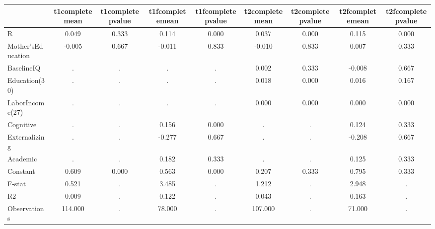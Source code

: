 \begin{table}[htbp]
\begin{tabular}{lcccccccc} \hline \hline
 & t1completemean  & t1completepvalue  & t1fcompletemean  & t1fcompletepvalue  & t2completemean  & t2completepvalue  & t2fcompletemean  & t2fcompletepvalue  \\  \hline 
R &     0.049 &     0.333 &     0.114 &     0.000 &     0.037 &     0.000 &     0.115 &     0.000 \\  
Mother'sEducation &    -0.005 &     0.667 &    -0.011 &     0.833 &    -0.010 &     0.833 &     0.007 &     0.333 \\  
BaselineIQ &         . &         . &         . &         . &     0.002 &     0.333 &    -0.008 &     0.667 \\  
Education(30) &         . &         . &         . &         . &     0.018 &     0.000 &     0.016 &     0.167 \\  
LaborIncome(27) &         . &         . &         . &         . &     0.000 &     0.000 &     0.000 &     0.000 \\  
Cognitive &         . &         . &     0.156 &     0.000 &         . &         . &     0.124 &     0.333 \\  
Externalizing &         . &         . &    -0.277 &     0.667 &         . &         . &    -0.208 &     0.667 \\  
Academic &         . &         . &     0.182 &     0.333 &         . &         . &     0.125 &     0.333 \\  
Constant &     0.609 &     0.000 &     0.563 &     0.000 &     0.207 &     0.333 &     0.795 &     0.333 \\  
F-stat &     0.521 &         . &     3.485 &         . &     1.212 &         . &     2.948 &         . \\  
R2 &     0.009 &         . &     0.122 &         . &     0.043 &         . &     0.163 &         . \\  
Observations &   114.000 &         . &    78.000 &         . &   107.000 &         . &    71.000 &         . \\  
\hline \hline \end{tabular}
\end{table}
